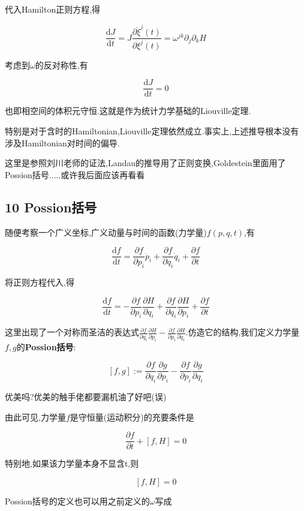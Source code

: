 \documentclass[UTF8]{article}
\newcommand{\D}{\mathrm{d}}
\begin{document}
	代入Hamilton正则方程,得

	\[\frac{\D J}{\D t} = J \frac{\partial \dot{\xi}^{j}(t)}{\partial \xi^{j}(t)} = \omega^{jk} \partial_{j} \partial_{k} H\]

	考虑到$\omega$的反对称性,有
	
	\[\frac{\D J}{\D t} = 0 \]

	也即相空间的体积元守恒.这就是作为统计力学基础的Liouville定理.
	
	特别是对于含时的Hamiltonian,Liouville定理依然成立.事实上,上述推导根本没有涉及Hamiltonian对时间的偏导.
	
	这里是参照刘川老师的证法,Landau的推导用了正则变换,Goldestein\cite{Goldestin}里面用了Possion括号.....或许我后面应该再看看
	
	
	
	
	\newpage
	
	
\subsection*{10 Possion括号}
	
	随便考察一个广义坐标,广义动量与时间的函数(力学量)$f(p,q,t)$,有
	
	\[\frac{\D f}{\D t} = \frac{\partial f}{\partial p_{i}} \dot{p}_{i} + \frac{\partial f}{\partial q_{i}} \dot{q}_{i} + \frac{\partial f}{\partial t}\]
	
	将正则方程代入,得
	
	\[\frac{\D f}{\D t} = -\frac{\partial f}{\partial p_{i}} \frac{\partial H}{\partial q_{i}} + \frac{\partial f}{\partial q_{i}} \frac{\partial H}{\partial p_{i}} + \frac{\partial f}{\partial t}\]
	
	这里出现了一个对称而圣洁的表达式$\frac{\partial f}{\partial q_{i}} \frac{\partial H}{\partial p_{i}} - \frac{\partial f}{\partial p_{i}} \frac{\partial H}{\partial q_{i}}$.仿造它的结构,我们定义力学量$f,g$的\textbf{Possion括号}:
	
	\[[f,g] := \frac{\partial f}{\partial q_{i}} \frac{\partial g}{\partial p_{i}} - \frac{\partial f}{\partial p_{i}} \frac{\partial g}{\partial q_{i}}\]
	
	优美吗?优美的触手佬都要漏机油了好吧(误)
	
	由此可见,力学量$f$是守恒量(运动积分)的充要条件是
	
	\[\frac{\partial f}{\partial t} + [f,H] = 0\]
	
	特别地,如果该力学量本身不显含t,则
	
	\[[f,H] = 0\]
	
	Possion括号的定义也可以用之前定义的$\omega$写成
	
\end{document}
